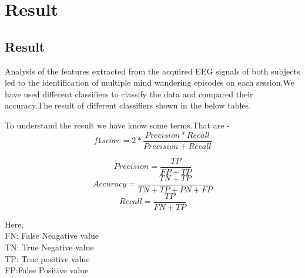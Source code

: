 
\chapter{Result} %

\label{Chapter5} %





\section{Result}
Analysis of the features extracted from the acquired EEG signals of both subjects led to the identification of multiple mind wandering episodes on each session.We have used different classifiers to classify the data and compared their accuracy.The result of different classifiers shown in the below tables.

To understand the result we have know some terms.That are -
\begin{equation}
    f1 score = 2 * \frac{Precision * Recall}{ Precision + Recall }
\end{equation}

\begin{equation}
    Precision = \frac{TP}{FP + TP}
\end{equation}
\begin{equation}
    Accuracy = \frac{TN + TP }{TN+TP+PN+FP}
\end{equation}
\begin{equation}
    Recall = \frac{TP}{ FN + TP}
\end{equation}

Here,\\
FN: False Neagative value \\
TN: True Negative value \\
TP: True positive value \\
FP:False Positive value \\

